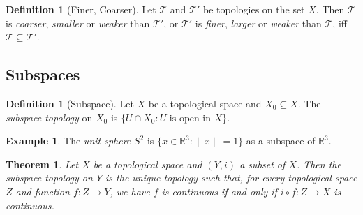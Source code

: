 \documentclass{book}
\newtheorem{thm}[ax]{Theorem}
\theoremstyle{definition}
\newtheorem{df}[ax]{Definition}
\newtheorem{ex}[ax]{Example}
\begin{document}
\begin{df}[Finer, Coarser]
Let $\mathcal{T}$ and $\mathcal{T}'$ be topologies on the set $X$. Then $\mathcal{T}$ is \emph{coarser}, \emph{smaller} or \emph{weaker} than $\mathcal{T}'$, or $\mathcal{T}'$ is \emph{finer}, \emph{larger} or \emph{weaker} than $\mathcal{T}$, iff $\mathcal{T} \subseteq \mathcal{T}'$.
\end{df}

\subsection{Subspaces}

\begin{df}[Subspace]
Let $X$ be a topological space and $X_0 \subseteq X$. The \emph{subspace topology} on $X_0$ is $\{ U \cap X_0 : U \text{ is open in } X \}$.
\end{df}

\begin{ex}
The \emph{unit sphere} $S^2$ is $\{ x \in \mathbb{R}^3 : \| x \| = 1 \}$ as a subspace of $\mathbb{R}^3$.
\end{ex}

\begin{thm}
\label{thm:subspace_universal}
Let $X$ be a topological space and $(Y,i)$ a subset of $X$. Then the subspace topology on $Y$ is the unique topology such that, for every topological space $Z$ and function $f : Z \rightarrow Y$, we have $f$ is continuous if and only if $i \circ f : Z \rightarrow X$ is continuous.
\end{thm}
\end{document}

